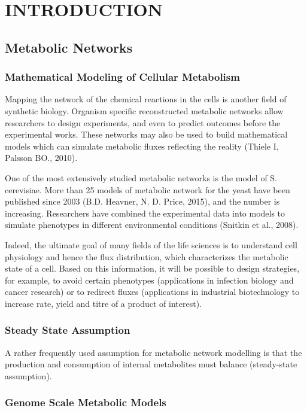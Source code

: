 \chapter{INTRODUCTION}

\section{Metabolic Networks}
\subsection{Mathematical Modeling of Cellular Metabolism}

Mapping the network of the chemical reactions in the cells is another field of synthetic biology. Organism specific reconstructed metabolic networks allow researchers to design experiments, and even to predict outcomes before the experimental works. These networks may also be used to build mathematical models which can simulate metabolic fluxes reflecting the reality (Thiele I, Palsson BO., 2010).

One of the most extensively studied metabolic networks is the model of S. cerevisiae. More than 25 models of metabolic network for the yeast have been published since 2003 (B.D. Heavner, N. D. Price, 2015), and the number is increasing. Researchers have combined the experimental data into models to simulate phenotypes in different environmental conditions (Snitkin et al., 2008).


Indeed, the ultimate goal of many fields of the life sciences is to understand cell physiology and hence the flux distribution, which characterizes the metabolic state of a cell. Based on this information, it will be possible to design strategies, for example, to avoid certain phenotypes (applications in infection biology and cancer research) or to redirect fluxes (applications in industrial biotechnology to increase rate, yield and titre of a product of interest). \cite{blank2017let}

\subsection{Steady State Assumption}

A rather frequently used assumption for metabolic network modelling is that the production and consumption of internal metabolites must balance (steady-state assumption). \cite{reimers2016steady}


\subsection{Genome Scale Metabolic Models}
